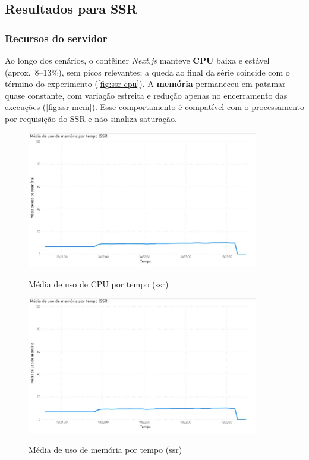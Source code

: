 \subsection{Resultados para SSR}
\label{subsec:resultados-ssr}

\subsubsection*{Recursos do servidor}
Ao longo dos cenários, o contêiner \textit{Next.js} manteve \textbf{CPU} baixa e estável (aprox.\ 8--13\%), sem picos relevantes; a queda ao final da série coincide com o término do experimento (\autoref{fig:ssr-cpu}). A \textbf{memória} permaneceu em patamar quase constante, com variação estreita e redução apenas no encerramento das execuções (\autoref{fig:ssr-mem}). Esse comportamento é compatível com o processamento por requisição do SSR e não sinaliza saturação.

\begin{figure}[H]
  \centering
  \caption{Média de uso de CPU por tempo (\acrshort{ssr})}
  \includegraphics[width=0.9\textwidth]{media/uso_cpu_ssr.jpeg}
  \label{fig:ssr-cpu}
\end{figure}

\begin{figure}[H]
  \centering
  \caption{Média de uso de memória por tempo (\acrshort{ssr})}
  \includegraphics[width=0.9\textwidth]{media/uso_memoria_ssr.jpeg}
  \label{fig:ssr-mem}
\end{figure}

